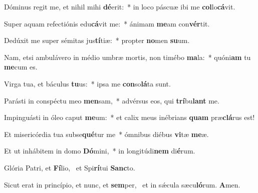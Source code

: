 \item Dóminus regit me, et nihil mihi \textbf{dé}erit:~* in loco páscuæ ibi me \textbf{col}lo\textbf{cá}vit.
\item Super aquam refectiónis edu\textbf{cá}vit me:~* ánimam \textbf{me}am con\textbf{vér}tit.
\item Dedúxit me super sémitas jus\textbf{tí}tiæ:~* propter \textbf{no}men \textbf{su}um.
\item Nam, etsi ambulávero in médio umbræ mortis, non timébo \textbf{ma}la:~* quóni\textbf{am} tu \textbf{me}cum es.
\item Virga tua, et báculus \textbf{tu}us:~* ipsa me \textbf{con}so\textbf{lá}ta sunt.
\item Parásti in conspéctu meo \textbf{men}sam,~* advérsus eos, qui \textbf{trí}bu\textbf{lant} me.
\item Impinguásti in óleo caput \textbf{me}um:~* et calix meus inébrians \textbf{quam} præ\textbf{clá}rus est!
\item Et misericórdia tua subse\textbf{qué}tur me~* ómnibus diébus \textbf{vi}tæ \textbf{me}æ.
\item Et ut inhábitem in domo \textbf{Dó}mini,~* in longitúdi\textbf{nem} di\textbf{é}rum.
\item Glória Patri, et \textbf{Fí}lio,~\psstar{} et Spi\textbf{rí}tui \textbf{Sanc}to.
\item Sicut erat in princípio, et nunc, et \textbf{sem}per,~\psstar{} et in sǽcula sæcu\textbf{ló}rum. \textbf{A}men.
